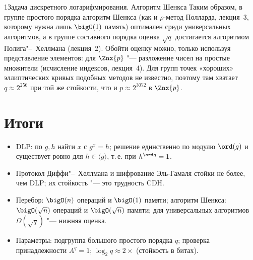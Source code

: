 \begin{lecture}{1}{Задача дискретного логарифмирования. Алгоритм Шенкса}
Таким образом, в группе простого порядка алгоритм Шенкса (как и $\rho$-метод Полларда,
лекция~3, которому нужна лишь $\bigO(1)$ память) оптимален среди универсальных алгоритмов, а
в группе составного порядка оценка $\sqrt q$ достигается алгоритмом Полига"--~Хеллмана
(лекция~2). Обойти оценку можно, только используя представление элементов: для $\Znx{p}$ "---
разложение чисел на простые множители (исчисление индексов, лекция~4). Для групп точек
«хороших» эллиптических кривых подобных методов не известно, поэтому там хватает $q \approx 2^{256}$
при той же стойкости, что и $p \approx 2^{3072}$ в $\Znx{p}$.


\section{Итоги}

\begin{itemize}
  \item DLP: по $g, h$ найти $x$ с $g^x = h$; решение единственно по модулю $\ord(g)$ и
    существует ровно для $h \in \langle g \rangle$, т.\,е. при $h^{\ord g} = 1$.
  \item Протокол Диффи"--~Хеллмана и шифрование Эль-Гамаля стойки не более, чем DLP; их стойкость
    "--- это трудность CDH.
  \item Перебор: $\bigO(n)$ операций и $\bigO(1)$ памяти; алгоритм Шенкса: $\bigO(\sqrt n)$
    операций и $\bigO(\sqrt n)$ памяти; для универсальных алгоритмов $\Omega(\sqrt q)$ "---
    нижняя оценка.
  \item Параметры: подгруппа большого простого порядка $q$; проверка принадлежности $A^q = 1$;
    $\log_2 q \approx 2 \times$ (стойкость в битах).
\end{itemize}

\checkyourselfsection

\begin{furtherreading}
\end{furtherreading}
\end{lecture}
